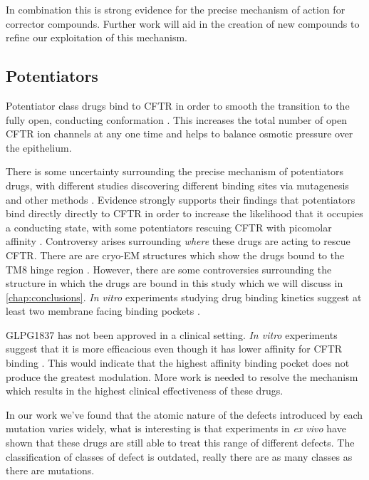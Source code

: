 In combination this is strong evidence for the precise mechanism of action for corrector compounds. Further work will aid in the creation of new compounds to refine our exploitation of this mechanism.

\subsection{Potentiators}
Potentiator class drugs bind to CFTR in order to smooth the transition to the fully open, conducting conformation \cite{yeh2017}. This increases the total number of open CFTR ion channels at any one time and helps to balance osmotic pressure over the epithelium.

There is some uncertainty surrounding the precise mechanism of potentiators drugs, with different studies discovering different binding sites via mutagenesis and other methods \cite{yeh2019, liu2019, laselva2021}. Evidence strongly supports their findings that potentiators bind directly directly to CFTR in order to increase the likelihood that it occupies a conducting state, with some potentiators rescuing CFTR with picomolar affinity \cite{csanady2019}. Controversy arises surrounding \textit{where} these drugs are acting to rescue CFTR. There are are cryo-EM structures which show the drugs bound to the TM8 hinge region \cite{liu2019}. However, there are some controversies surrounding the structure in which the drugs are bound in this study which we will discuss in \ref{chap:conclusions}. \textit {In vitro} experiments studying drug binding kinetics suggest at least two membrane facing binding pockets \cite{csanady2019}. 

GLPG1837 has not been approved in a clinical setting. \textit {In vitro} experiments suggest that it is more efficacious even though it has lower affinity for CFTR binding \cite{vanderplas2018}. This would indicate that the highest affinity binding pocket does not produce the greatest modulation. More work is needed to resolve the mechanism which results in the highest clinical effectiveness of these drugs.  

In our work we've found that the atomic nature of the defects introduced by each mutation varies widely, what is interesting is that experiments in \textit{ex vivo} have shown that these drugs are still able to treat this range of different defects. The classification of classes of defect is outdated, really there are as many classes as there are mutations.


